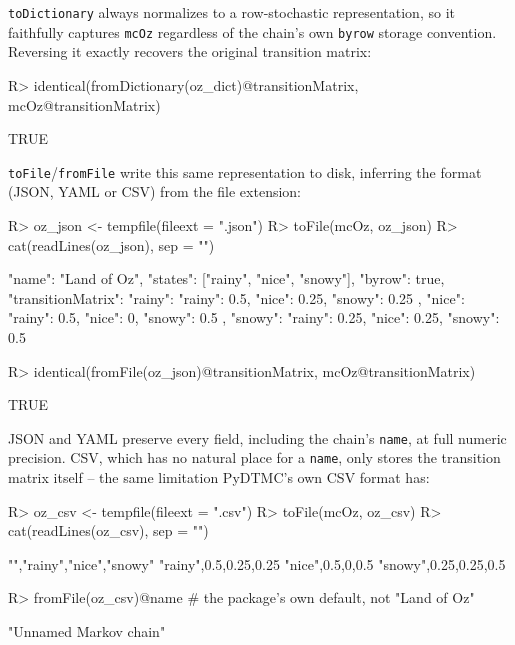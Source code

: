 \documentclass[
  nojss]{jss}
\begin{document}
\texttt{toDictionary} always normalizes to a row-stochastic representation, so it
faithfully captures \texttt{mcOz} regardless of the chain's own \texttt{byrow} storage
convention. Reversing it exactly recovers the original transition matrix:

\begin{CodeChunk}
\begin{CodeInput}
R> identical(fromDictionary(oz_dict)@transitionMatrix, mcOz@transitionMatrix)
\end{CodeInput}
\begin{CodeOutput}
[1] TRUE
\end{CodeOutput}
\end{CodeChunk}

\texttt{toFile}/\texttt{fromFile} write this same representation to disk, inferring the
format (JSON, YAML or CSV) from the file extension:

\begin{CodeChunk}
\begin{CodeInput}
R> oz_json <- tempfile(fileext = ".json")
R> toFile(mcOz, oz_json)
R> cat(readLines(oz_json), sep = "\n")
\end{CodeInput}
\begin{CodeOutput}
{
  "name": "Land of Oz",
  "states": ["rainy", "nice", "snowy"],
  "byrow": true,
  "transitionMatrix": {
    "rainy": {
      "rainy": 0.5,
      "nice": 0.25,
      "snowy": 0.25
    },
    "nice": {
      "rainy": 0.5,
      "nice": 0,
      "snowy": 0.5
    },
    "snowy": {
      "rainy": 0.25,
      "nice": 0.25,
      "snowy": 0.5
    }
  }
}
\end{CodeOutput}
\begin{CodeInput}
R> identical(fromFile(oz_json)@transitionMatrix, mcOz@transitionMatrix)
\end{CodeInput}
\begin{CodeOutput}
[1] TRUE
\end{CodeOutput}
\end{CodeChunk}

JSON and YAML preserve every field, including the chain's \texttt{name}, at full
numeric precision. CSV, which has no natural place for a \texttt{name}, only
stores the transition matrix itself -- the same limitation PyDTMC's own CSV
format has:

\begin{CodeChunk}
\begin{CodeInput}
R> oz_csv <- tempfile(fileext = ".csv")
R> toFile(mcOz, oz_csv)
R> cat(readLines(oz_csv), sep = "\n")
\end{CodeInput}
\begin{CodeOutput}
"","rainy","nice","snowy"
"rainy",0.5,0.25,0.25
"nice",0.5,0,0.5
"snowy",0.25,0.25,0.5
\end{CodeOutput}
\begin{CodeInput}
R> fromFile(oz_csv)@name # the package's own default, not "Land of Oz"
\end{CodeInput}
\begin{CodeOutput}
[1] "Unnamed Markov chain"
\end{CodeOutput}
\end{CodeChunk}
\end{document}
